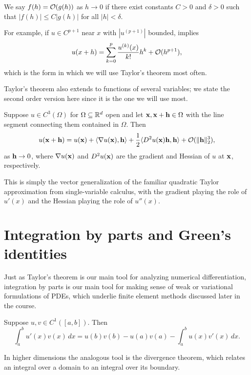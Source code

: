 \begin{definition}\label{def:big_o}
    We say $f(h) = \mathcal{O}(g(h))$ as $h \to 0$ if there exist constants $C >
    0$ and $\delta > 0$ such that $|f(h)| \le C |g(h)|$ for all $|h| <
    \delta$.
\end{definition}
For example, if $u \in C^{p+1}$ near $x$ with $|u^{(p+1)}|$ bounded,
 implies
\begin{equation*}
    u(x+h) = \sum_{k=0}^p \frac{u^{(k)}(x)}{k!} h^k + \mathcal{O}(h^{p+1}),
\end{equation*}
which is the form in which we will use Taylor's theorem most often.

Taylor's theorem also extends to functions of several variables; we
state the second order version here since it is the one we will use
most.

\begin{theorem}
    Suppose $u \in C^3(\Omega)$ for $\Omega \subseteq \mathbb{R}^d$ open and let
    $\mathbf{x}, \mathbf{x} + \mathbf{h} \in \Omega$ with the line segment connecting them
    contained in $\Omega$. Then
    \begin{equation*}
        u(\mathbf{x} + \mathbf{h}) = u(\mathbf{x}) + \langle \nabla u(\mathbf{x}), \mathbf{h} \rangle +
        \frac12 \langle D^2 u(\mathbf{x}) \mathbf{h}, \mathbf{h} \rangle + \mathcal{O}(\|\mathbf{h}\|_2^3),
    \end{equation*}
    as $\mathbf{h} \to 0$, where $\nabla u(\mathbf{x})$ and $D^2 u(\mathbf{x})$ are the
    gradient and Hessian of $u$ at $\mathbf{x}$, respectively.
\end{theorem}
This is simply the vector generalization of the familiar quadratic
Taylor approximation from single-variable calculus, with the gradient
playing the role of $u'(x)$ and the Hessian playing the role of
$u''(x)$.


\section{Integration by parts and Green's identities}

Just as Taylor's theorem is our main tool for analyzing numerical
differentiation, integration by parts is our main tool for making sense
of weak or variational formulations of PDEs, which underlie finite
element methods discussed later in the course.

\begin{theorem}
    Suppose $u, v \in C^1([a,b])$. Then
    \begin{equation*}
        \int_a^b u'(x) v(x) \, dx = u(b)v(b) - u(a)v(a) -
        \int_a^b u(x) v'(x) \, dx.
    \end{equation*}
\end{theorem}
In higher dimensions the analogous tool is the divergence theorem,
which relates an integral over a domain to an integral over its
boundary.

